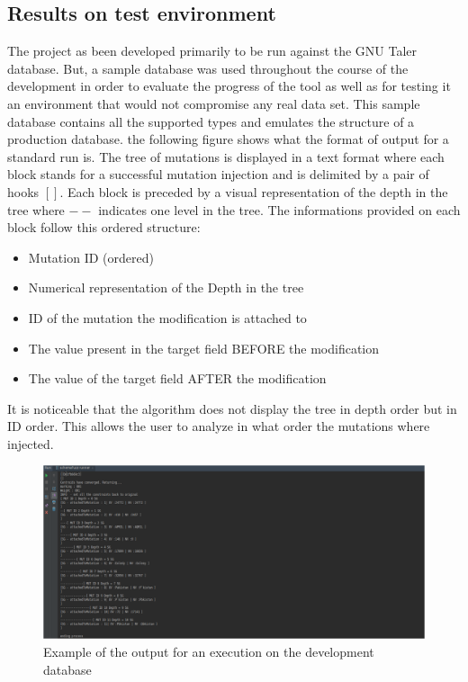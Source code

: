 \documentclass{article}
\begin{document}
\begin{empfile}
		\subsection{Results on test environment}
The project as been developed primarily to be run against the GNU Taler database. But, a sample database was used throughout the course of the development in order to evaluate the progress of the tool as well as for testing it an environment that would not compromise any real data set.
This sample database contains all the supported types and emulates the structure of a production database.
the following figure shows what the format of output for a standard run is. The tree of mutations is displayed in a text format where each block stands for a successful mutation injection and is delimited by a pair of hooks $[]$. Each block is preceded by a visual representation of the depth in the tree where $--$ indicates one level in the tree. 
The informations provided on each block follow this ordered structure:
		\begin{itemize}
		\item{Mutation ID (ordered)}
		\item{Numerical representation of the Depth in the tree}
		\item{ID of the mutation the modification is attached to}
		\item{The value present in the target field BEFORE the modification}
		\item{The value of the target field AFTER the modification}
		\end{itemize}
				

It is noticeable that the algorithm does not display the tree in depth order but in ID order.
This allows the user to analyze in what order the mutations where injected.

		\bigskip
		\begin{figure} [h!]
			\includegraphics[width=\textwidth]{sc2.png}
			\caption{Example of the output for an execution on the development database}
		\end{figure}
		\bigskip
		

\end{empfile}
\end{document}

